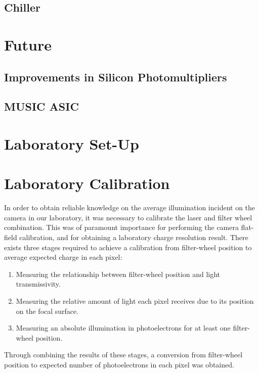 \subsection{Chiller}

\section{Future} \label{section:checs_future}

\subsection{Improvements in Silicon Photomultipliers}


\subsection{MUSIC ASIC}

\section{Laboratory Set-Up}

\section{Laboratory Calibration} \label{section:lab-calib}

In order to obtain reliable knowledge on the average illumination incident on the camera in our laboratory, it was necessary to calibrate the laser and filter wheel combination. This was of paramount importance for performing the camera flat-field calibration, and for obtaining a laboratory charge resolution result. There exists three stages required to achieve a calibration from filter-wheel position to average expected charge in each pixel:
\begin{enumerate}
\item Measuring the relationship between filter-wheel position and light transmissivity.
\item Measuring the relative amount of light each pixel receives due to its position on the focal surface.
\item Measuring an absolute illumination in photoelectrons for at least one filter-wheel position.
\end{enumerate}
Through combining the results of these stages, a conversion from filter-wheel position to expected number of photoelectrons in each pixel was obtained.

